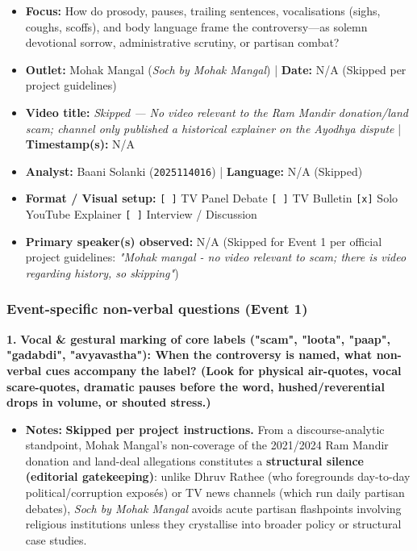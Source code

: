 \documentclass[10pt,a4paper]{article}
\begin{document}
\begin{itemize}
  \item \textbf{Focus:} How do prosody, pauses, trailing sentences, vocalisations (sighs, coughs, scoffs), and body language frame the controversy---as solemn devotional sorrow, administrative scrutiny, or partisan combat?
  \item \textbf{Outlet:} Mohak Mangal (\textit{Soch by Mohak Mangal}) | \textbf{Date:} N/A (Skipped per project guidelines)
  \item \textbf{Video title:} \textit{Skipped --- No video relevant to the Ram Mandir donation/land scam; channel only published a historical explainer on the Ayodhya dispute} | \textbf{Timestamp(s):} N/A
  \item \textbf{Analyst:} Baani Solanki (\texttt{2025114016}) | \textbf{Language:} N/A (Skipped)
  \item \textbf{Format / Visual setup:} \texttt{[ ]} TV Panel Debate \texttt{[ ]} TV Bulletin \texttt{[x]} Solo YouTube Explainer \texttt{[ ]} Interview / Discussion
  \item \textbf{Primary speaker(s) observed:} N/A (Skipped for Event 1 per official project guidelines: \textit{"Mohak mangal - no video relevant to scam; there is video regarding history, so skipping"})
\end{itemize}

\subsubsection*{Event-specific non-verbal questions (Event 1)}

\noindent\textbf{1.} \textbf{Vocal \& gestural marking of core labels ("scam", "loota", "paap", "gadabdi", "avyavastha"): When the controversy is named, what non-verbal cues accompany the label? (Look for physical air-quotes, vocal scare-quotes, dramatic pauses before the word, hushed/reverential drops in volume, or shouted stress.)}\par\smallskip
\begin{itemize}
  \item \textbf{Notes:}
\textbf{Skipped per project instructions.} From a discourse-analytic standpoint, Mohak Mangal's non-coverage of the 2021/2024 Ram Mandir donation and land-deal allegations constitutes a \textbf{structural silence (editorial gatekeeping)}: unlike Dhruv Rathee (who foregrounds day-to-day political/corruption exposés) or TV news channels (which run daily partisan debates), \textit{Soch by Mohak Mangal} avoids acute partisan flashpoints involving religious institutions unless they crystallise into broader policy or structural case studies.\par\smallskip
\end{itemize}
\end{document}
